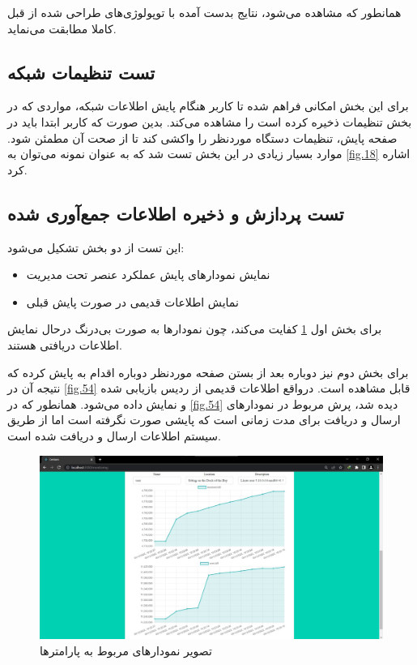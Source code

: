 \cleardoublepage

همانطور که مشاهده می‌شود، نتایج بدست آمده با توپولوژی‌های طراحی شده از قبل کاملا مطابقت می‌نماید.

\subsection{تست تنظیمات شبکه}

برای این بخش امکانی فراهم شده تا کاربر هنگام پایش اطلاعات شبکه، مواردی که در بخش تنظیمات ذخیره کرده است را مشاهده می‌کند. بدین صورت که کاربر ابتدا باید در صفحه پایش، تنظیمات دستگاه موردنظر را واکشی کند تا از صحت آن مطمئن شود. موارد بسیار زیادی در این بخش تست شد که به عنوان نمونه می‌توان به \cref{fig.18} اشاره کرد.


\subsection{تست پردازش و ذخیره اطلاعات جمع‌آوری شده}

این تست از دو بخش تشکیل می‌شود:

\begin{itemize}
    \item نمایش نمودارهای پایش عملکرد عنصر تحت مدیریت
    \item نمایش اطلاعات قدیمی در صورت پایش قبلی
\end{itemize}

برای بخش اول \cref{fig.53} کفایت می‌کند، چون نمودارها به صورت بی‌درنگ درحال نمایش اطلاعات دریافتی هستند.


برای بخش دوم نیز دوباره بعد از بستن صفحه موردنظر دوباره اقدام به پایش کرده که نتیجه آن در \cref{fig.54} قابل مشاهده است. درواقع اطلاعات قدیمی از ردیس بازیابی شده و نمایش داده می‌شود. همانطور که در \cref{fig.54} دیده شد، پرش مربوط در نمودارهای ارسال و دریافت برای مدت زمانی است که پایشی صورت نگرفته است اما از طریق سیستم اطلاعات ارسال و دریافت شده است.

\begin{figure}[!h]
    \centering\includegraphics[scale=.38]{./monitoring-before}
    \caption{تصویر نمودارهای مربوط به پارامترها}\label{fig.53}
\end{figure}


